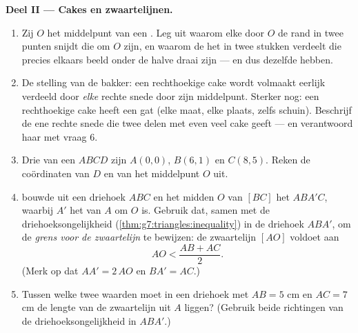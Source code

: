 \begin{problem}
\medskip
\noindent\textbf{Deel II --- Cakes en zwaartelijnen.}
\begin{enumerate}[resume]
  \item Zij $O$ het middelpunt van een . Leg uit waarom elke  door
        $O$ de rand in twee punten snijdt die  om $O$ zijn, en waarom de
         het  in twee stukken verdeelt die precies elkaars beeld
        onder de halve draai zijn --- en dus dezelfde  hebben.
  \item De stelling van de bakker: een rechthoekige cake wordt volmaakt eerlijk
        verdeeld door \emph{elke} rechte snede door zijn middelpunt. Sterker nog: een
        rechthoekige cake heeft een  gat (elke maat, elke plaats, zelfs
        schuin). Beschrijf de ene rechte snede die twee delen met even veel cake geeft
        --- en verantwoord haar met vraag 6.
  \item Drie  van een  $ABCD$ zijn $A(0, 0)$, $B(6, 1)$ en
        $C(8, 5)$. Reken de coördinaten van $D$ en van het middelpunt $O$ uit.
  \item {} bouwde uit een driehoek $ABC$ en het midden $O$ van
        $[BC]$ het  $ABA'C$, waarbij $A'$ het  van $A$ om
        $O$ is. Gebruik dat, samen met de driehoeksongelijkheid
        (\cref{thm:g7:triangles:inequality}) in de driehoek $ABA'$, om de
        \emph{grens voor de zwaartelijn} te bewijzen: de zwaartelijn $[AO]$ voldoet
        aan
        \[
        AO < \frac{AB + AC}{2} .
        \]
        (Merk op dat $AA' = 2\,AO$ en $BA' = AC$.)
  \item Tussen welke twee waarden moet in een driehoek met $AB = 5$ cm en
        $AC = 7$ cm de lengte van de zwaartelijn uit $A$ liggen? (Gebruik beide
        richtingen van de driehoeksongelijkheid in $ABA'$.)
\end{enumerate}


\end{problem}

